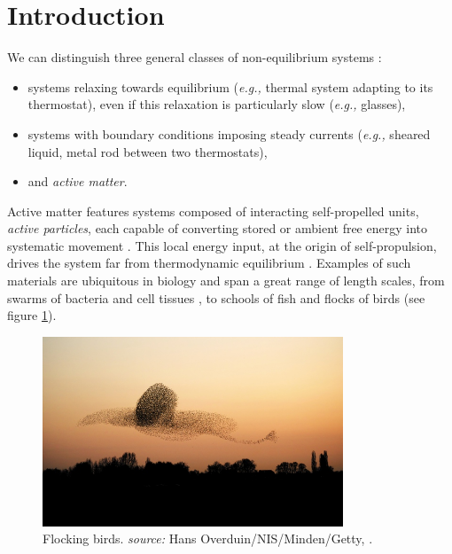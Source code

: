 \documentclass[class=report, float=false, crop=false]{standalone}
\begin{document}
\chapter*{Introduction}
\label{introduction}

We can distinguish three general classes of non-equilibrium systems \cite{cates2015motility}:
\begin{itemize}
  \item systems relaxing towards equilibrium (\textit{e.g.,} thermal system adapting to its thermostat), even if this relaxation is particularly slow (\textit{e.g.,} glasses),
  \item systems with boundary conditions imposing steady currents (\textit{e.g.,} sheared liquid, metal rod between two thermostats),
  \item and \textit{active matter}.
\end{itemize}
Active matter features systems composed of interacting self-propelled units, \textit{active particles}, each capable of converting stored or ambient free energy into systematic movement \cite{marchetti2013hydrodynamics}. This local energy input, at the origin of self-propulsion, drives the system far from thermodynamic equilibrium \cite{levis2014clustering}. Examples of such materials are ubiquitous in biology and span a great range of length scales, from swarms of bacteria \cite{dombrowski2004self} and cell tissues \cite{angelini2011glass}, to schools of fish \cite{calovi2014swarming} and flocks of birds \cite{cavagna2014bird} (see figure \ref{birds}).\\

\begin{figure}[h!]
\centering
\includegraphics[width=0.8\textwidth]{birds}
\caption{Flocking birds. \textit{source:} Hans Overduin/NIS/Minden/Getty, \cite{popkin2016physics}.}
\label{birds}
\end{figure}
\end{document}
